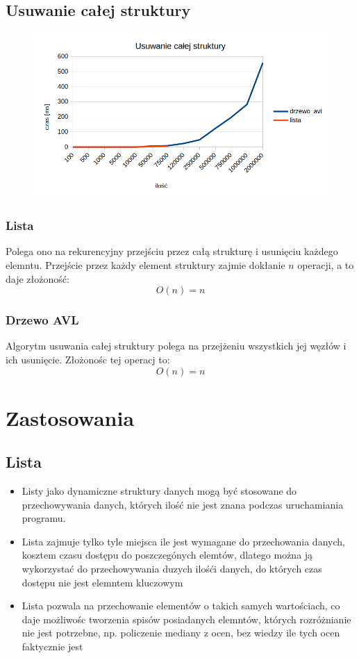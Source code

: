 \documentclass[]{article}
\begin{document}
		\subsection{Usuwanie całej struktury}
			\begin{figure}[H]
				\includegraphics{remove_all.png}
			\end{figure}
			\subsubsection{Lista}
				Polega ono na rekurencyjny przejściu przez całą strukturę i usunięciu każdego elemntu. Przejście przez każdy element struktury zajmie dokłanie $n$ operacji, a to daje złożoność:
				\[
				O(n) = n	
				\]
			\subsubsection{Drzewo AVL}
				Algorytm usuwania całej struktury polega na przejżeniu wszystkich jej węzłów i ich usunięcie. Złożonośc tej operacj to:
				\[
				O(n) = n
				\]
			
\pagebreak
					
\section{Zastosowania}
	\subsection{Lista}
		\begin{itemize}
			\item Listy jako dynamiczne struktury danych mogą być stosowane do przechowywania danych, których ilość nie jest znana podczas uruchamiania programu.
			
			\item Lista zajmuje tylko tyle miejsca ile jest wymagane do przechowania danych, kosztem czasu dostępu do poszczegónych elemtów, dlatego można ją wykorzystać do przechowywania duzych ilośći danych, do których czas dostępu nie jest elemntem kluczowym
			
			\item Lista pozwala na przechowanie elementów o takich samych wartościach, co daje możliwośc tworzenia spisów posiadanych elemntów, których rozróżnianie nie jest potrzebne, np. policzenie mediany z ocen, bez wiedzy ile tych ocen faktycznie jest
		\end{itemize}
\end{document}
